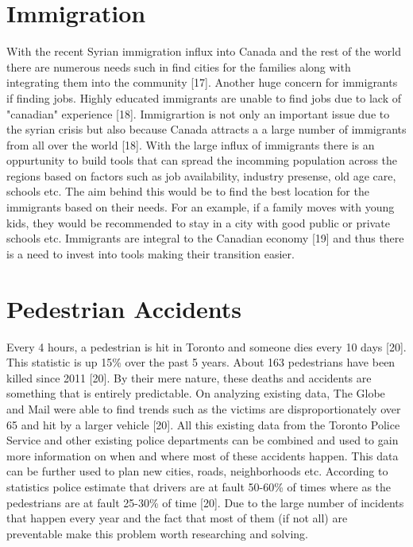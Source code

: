 \documentclass{article}
\begin{document}
\section{Immigration}
With the recent Syrian immigration influx into Canada and the rest of the world there are numerous needs such in find cities for the families along with integrating them into the community [17]. Another huge concern for immigrants if finding jobs. Highly educated immigrants are unable to find jobs due to lack of "canadian" experience [18]. Immigrartion is not only an important issue due to the syrian crisis but also because Canada attracts a a large number of immigrants from all over the world [18]. With the large influx of immigrants there is an oppurtunity to build tools that can spread the incomming population across the regions based on factors such as job availability, industry presense, old age care, schools etc. The aim behind this would be to find the best location for the immigrants based on their needs. For an example, if a family moves with young kids, they would be recommended to stay in a city with good public or private schools etc. Immigrants are integral to the Canadian economy [19] and thus there is a need to invest into tools making their transition easier.

\section{Pedestrian Accidents}
Every 4 hours, a pedestrian is hit in Toronto and someone dies every 10 days [20]. This statistic is up 15\% over the past 5 years. About 163 pedestrians have been killed since 2011 [20]. By their mere nature, these deaths and accidents are something that is entirely predictable. On analyzing existing data, The Globe and Mail were able to find trends such as the victims are disproportionately over 65 and hit by a larger vehicle [20]. All this existing data from the Toronto Police Service and other existing police departments can be combined and used to gain more information on when and where most of these accidents happen. This data can be further used to plan new cities, roads, neighborhoods etc. According to statistics police estimate that drivers are at fault 50-60\% of times where as the pedestrians are at fault 25-30\% of time [20]. Due to the large number of incidents that happen every year and the fact that most of them (if not all) are preventable make this problem worth researching and solving.

\newpage
\end{document}
